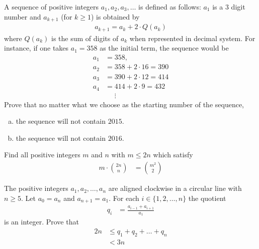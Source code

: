 \begin{problem}
	A sequence of positive integers $a_1, a_2, a_3, \dots$ is defined as follows: $a_1$ is a $3$ digit number and $a_{k+1}$ (for $k \geq 1$) is obtained by
	\begin{align*}
		a_{k+1} = a_k + 2 \cdot Q(a_k)
	\end{align*}
	where $Q(a_k)$ is the sum of digits of $a_k$ when represented in decimal system. For instance, if one takes $a_1 = 358$ as the initial term, the sequence would be
	\begin{align*}
		a_1 &= 358,\\
		a_2 &= 358 + 2 \cdot 16 = 390\\
		a_3 &= 390+ 2 \cdot 12 = 414\\
		a_4 &= 414 + 2 \cdot 9 = 432\\
		&\phantom{=}\vdots
	\end{align*}
	Prove that no matter what we choose as the starting number of the sequence,
	\begin{enumerate}[(a)]
		\item the sequence will not contain $2015$.
		\item the sequence will not contain $2016$.
	\end{enumerate}
\end{problem}

\begin{problem}
	Find all positive integers $m$ and $n$ with $m \leq 2n$ which satisfy
	\begin{align*}
		m \cdot \binom{2n}{n}
			& = \binom{m^2}{2}
	\end{align*}
\end{problem}

\begin{problem}
	The positive integers $a_1,a_2, \dots, a_n$ are aligned clockwise in a circular line with $n \geq 5$. Let $a_0=a_n$ and $a_{n+1}=a_1$. For each $i \in \{1,2,\dots,n \}$ the quotient
		\begin{align*}
			q_i
				& =\frac{a_{i-1}+a_{i+1}}{a_1}
		\end{align*}
	is an integer. Prove that
		\begin{align*}
			2n
				& \leq q_1+q_2+\dots+q_n\\
				& < 3n
		\end{align*}
\end{problem}

